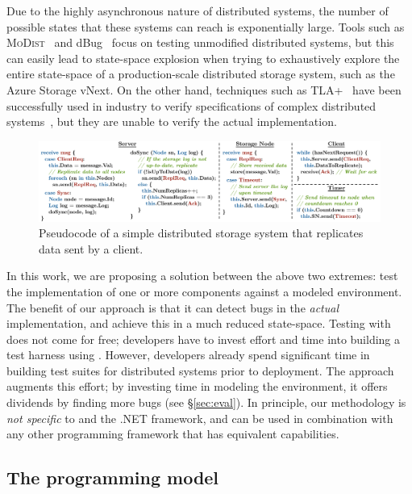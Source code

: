 Due to the highly asynchronous nature of distributed systems, the number of possible states that these systems can reach is exponentially large. Tools such as \textsc{MoDist}~\cite{yang2009modist} and dBug~\cite{simsa2011dbug} focus on testing unmodified distributed systems, but this can easily lead to state-space explosion when trying to exhaustively explore the entire state-space of a production-scale distributed storage system, such as the Azure Storage vNext. On the other hand, techniques such as TLA+~\cite{lamport1994temporal} have been successfully used in industry to verify specifications of complex distributed systems~\cite{newcombe2015aws}, but they are unable to verify the actual implementation.

\begin{figure}[t]
\centering
\includegraphics[width=\linewidth]{img/example_code}
\vspace{-7mm}
\caption{Pseudocode of a simple distributed storage system that replicates data sent by a client.}
\label{fig:example}
\vspace{-2mm}
\end{figure}

In this work, we are proposing a solution between the above two extremes: test the implementation of one or more components against a modeled \psharp environment. The benefit of our approach is that it can detect bugs in the \emph{actual} implementation, and achieve this in a much reduced state-space. Testing with \psharp does not come for free; developers have to invest effort and time into building a test harness using \psharp. However, developers already spend significant time in building test suites for distributed systems prior to deployment. The \psharp approach augments this effort; by investing time in modeling the environment, it offers dividends by finding more bugs (see \S\ref{sec:eval}). In principle, our methodology is \emph{not specific} to \psharp and the .NET framework, and can be used in combination with any other programming framework that has equivalent capabilities.

\vspace{-2mm}
\subsection{The \psharp programming model}
\label{sec:overview:psharp}

